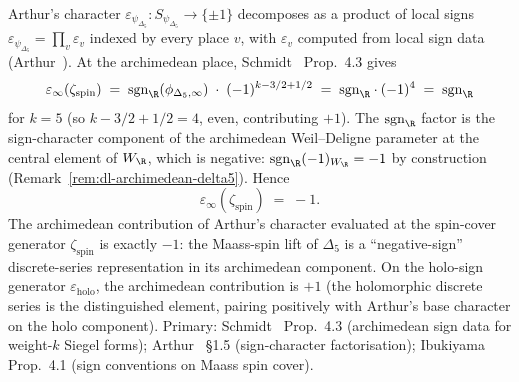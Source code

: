 \begin{remark}[Archimedean sign: $\varepsilon_\infty = -1$ from the discrete-series signature]
\label{rem:dl-kazhdan-eps-infty}
Arthur's character
$\varepsilon_{\psi_{\Delta_5}}\colon S_{\psi_{\Delta_5}} \to \{\pm 1\}$
decomposes as a product of local signs
$\varepsilon_{\psi_{\Delta_5}} = \prod_v \varepsilon_v$ indexed by
every place $v$, with $\varepsilon_v$ computed from local sign
data (Arthur~\cite[\S 1.5 and Thm.~2.2.1]{Arthur2013Endoscopic}). At
the archimedean place, Schmidt~\cite{Schmidt2017Archimedean}
Prop.\ 4.3 gives
\begin{equation}
\label{eq:kazhdan-eps-infty-formula}
 \varepsilon_\infty(\zeta_{\mathrm{spin}})
 \;=\;
 \mathrm{sgn}_\R(\phi_{\Delta_5, \infty})
 \;\cdot\;
 (-1)^{k - 3/2 + 1/2}
 \;=\;
 \mathrm{sgn}_\R \cdot (-1)^{4}
 \;=\;
 \mathrm{sgn}_\R
\end{equation}
for $k = 5$ (so $k - 3/2 + 1/2 = 4$, even, contributing $+1$). The
$\mathrm{sgn}_\R$ factor is the sign-character component of the
archimedean Weil--Deligne parameter at the central element of
$W_\R$, which is negative:
$\mathrm{sgn}_\R(-1)_{W_\R} = -1$ by construction
(Remark~\ref{rem:dl-archimedean-delta5}). Hence
\begin{equation}
\label{eq:kazhdan-eps-infty-value}
 \varepsilon_\infty(\zeta_{\mathrm{spin}})
 \;=\;
 -1.
\end{equation}
The archimedean contribution of Arthur's character evaluated at the
spin-cover generator $\zeta_{\mathrm{spin}}$ is exactly $-1$: the
Maass-spin lift of $\Delta_5$ is a ``negative-sign'' discrete-series
representation in its archimedean component. On the holo-sign
generator $\varepsilon_{\mathrm{holo}}$, the archimedean contribution
is $+1$ (the holomorphic discrete series is the distinguished
element, pairing positively with Arthur's base character on the
holo component). Primary: Schmidt~\cite{Schmidt2017Archimedean}
Prop.\ 4.3 (archimedean sign data for weight-$k$ Siegel forms);
Arthur~\cite{Arthur2013Endoscopic} \S 1.5 (sign-character
factorisation); Ibukiyama~\cite{Ibukiyama1998Paramodular} Prop.\ 4.1
(sign conventions on Maass spin cover).
\end{remark}

